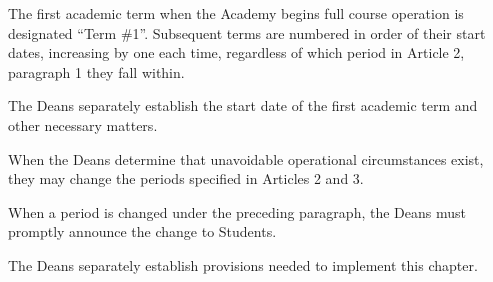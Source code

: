 \begin{articles}
  \item The first academic term when the Academy begins full course operation is designated ``Term \#1''. Subsequent terms are numbered in order of their start dates, increasing by one each time, regardless of which period in Article 2, paragraph 1 they fall within.
  \begin{paragraphs}
    \item The Deans separately establish the start date of the first academic term and other necessary matters.
  \end{paragraphs}
  \item When the Deans determine that unavoidable operational circumstances exist, they may change the periods specified in Articles 2 and 3.
  \begin{paragraphs}
    \item When a period is changed under the preceding paragraph, the Deans must promptly announce the change to Students.
  \end{paragraphs}
  \item The Deans separately establish provisions needed to implement this chapter.
\end{articles}
